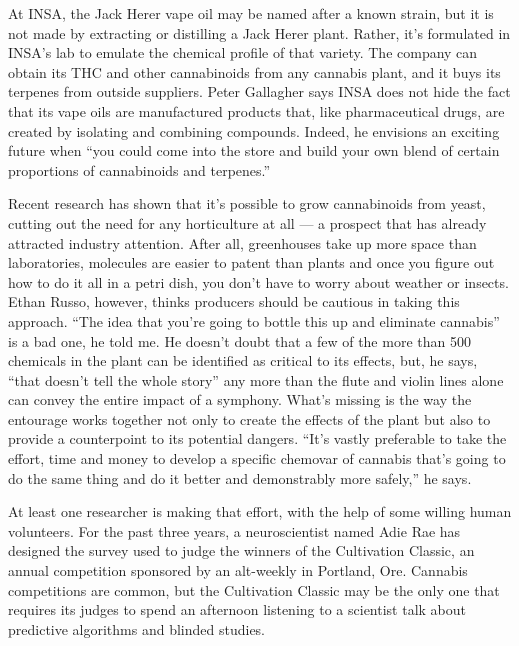 At INSA, the Jack Herer vape oil may be named after a known strain, but
it is not made by extracting or distilling a Jack Herer plant. Rather,
it's formulated in INSA's lab to emulate the chemical profile of that
variety. The company can obtain its THC and other cannabinoids from any
cannabis plant, and it buys its terpenes from outside suppliers. Peter
Gallagher says INSA does not hide the fact that its vape oils are
manufactured products that, like pharmaceutical drugs, are created by
isolating and combining compounds. Indeed, he envisions an exciting
future when ``you could come into the store and build your own blend of
certain proportions of cannabinoids and terpenes.''

Recent research has shown that it's possible to grow cannabinoids from
yeast, cutting out the need for any horticulture at all --- a prospect
that has already attracted industry attention. After all, greenhouses
take up more space than laboratories, molecules are easier to patent
than plants and once you figure out how to do it all in a petri dish,
you don't have to worry about weather or insects. Ethan Russo, however,
thinks producers should be cautious in taking this approach. ``The idea
that you're going to bottle this up and eliminate cannabis'' is a bad
one, he told me. He doesn't doubt that a few of the more than 500
chemicals in the plant can be identified as critical to its effects,
but, he says, ``that doesn't tell the whole story'' any more than the
flute and violin lines alone can convey the entire impact of a symphony.
What's missing is the way the entourage works together not only to
create the effects of the plant but also to provide a counterpoint to
its potential dangers. ``It's vastly preferable to take the effort, time
and money to develop a specific chemovar of cannabis that's going to do
the same thing and do it better and demonstrably more safely,'' he says.

At least one researcher is making that effort, with the help of some
willing human volunteers. For the past three years, a neuroscientist
named Adie Rae has designed the survey used to judge the winners of the
Cultivation Classic, an annual competition sponsored by an alt-weekly in
Portland, Ore. Cannabis competitions are common, but the Cultivation
Classic may be the only one that requires its judges to spend an
afternoon listening to a scientist talk about predictive algorithms and
blinded studies.

